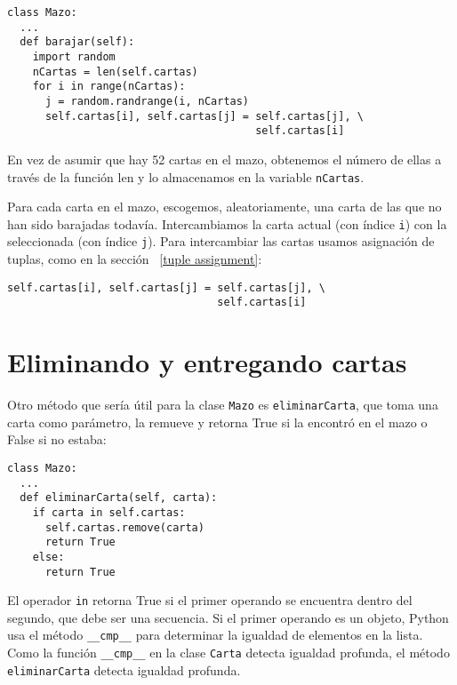 \begin{lstlisting}
class Mazo:
  ...
  def barajar(self):
    import random
    nCartas = len(self.cartas)
    for i in range(nCartas):
      j = random.randrange(i, nCartas)
      self.cartas[i], self.cartas[j] = self.cartas[j], \
                                       self.cartas[i]
\end{lstlisting}
 En vez de asumir que hay 52 cartas en el mazo, obtenemos el número
de ellas a través de la función len y lo almacenamos en la variable
\texttt{nCartas}.

  

Para cada carta en el mazo, escogemos, aleatoriamente, una carta de
las que no han sido barajadas todavía. Intercambiamos la carta actual
(con índice \texttt{i}) con la seleccionada (con índice \texttt{j}).
Para intercambiar las cartas usamos asignación de tuplas, como en
la sección ~\ref{tuple assignment}:
\begin{lstlisting}
self.cartas[i], self.cartas[j] = self.cartas[j], \
                                 self.cartas[i]
\end{lstlisting}

\section{Eliminando y entregando cartas}


Otro método que sería útil para la clase \texttt{Mazo} es \texttt{eliminarCarta},
que toma una carta como parámetro, la remueve y retorna True si la
encontró en el mazo o False si no estaba:

\begin{lstlisting}
class Mazo:
  ...
  def eliminarCarta(self, carta):
    if carta in self.cartas:
      self.cartas.remove(carta)
      return True
    else: 
      return True
\end{lstlisting}
 El operador \texttt{in} retorna True si el primer operando se encuentra
dentro del segundo, que debe ser una secuencia. Si el primer operando
es un objeto, Python usa el método \texttt{\_\_cmp\_\_} para determinar
la igualdad de elementos en la lista. Como la función \texttt{\_\_cmp\_\_}
en la clase \texttt{Carta} detecta igualdad profunda, el método \texttt{eliminarCarta}
detecta igualdad profunda.

 

